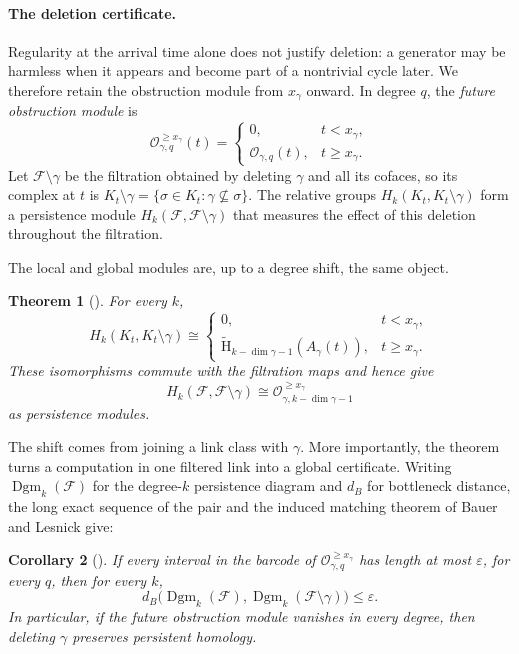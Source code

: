 \documentclass[11pt,letterpaper]{article}
\newtheorem{theorem}{Theorem}[section]
\newtheorem{corollary}[theorem]{Corollary}
\theoremstyle{definition}
\newcommand{\redH}{\widetilde{\mathrm H}}
\newcommand{\Dgm}{\operatorname{Dgm}}
\newcommand{\Oc}{\mathcal O}
\newcommand{\eps}{\varepsilon}
\begin{document}
\paragraph{The deletion certificate.}
Regularity at the arrival time alone does not justify deletion: a generator
may be harmless when it appears and become part of a nontrivial cycle later.
We therefore retain the obstruction module from $x_\gamma$ onward. In degree
$q$, the \emph{future obstruction module} is
$$
\Oc_{\gamma,q}^{\geq x_\gamma}(t)
=
\begin{cases}
0, & t<x_\gamma,\\
\Oc_{\gamma,q}(t), & t\geq x_\gamma.
\end{cases}
$$
Let $\mathcal F\setminus\gamma$ be the filtration obtained by deleting
$\gamma$ and all its cofaces, so its complex at $t$ is
$K_t\setminus\gamma=\{\sigma\in K_t:\gamma\not\subseteq\sigma\}$. The relative
groups $H_k(K_t,K_t\setminus\gamma)$ form a persistence module
$H_k(\mathcal F,\mathcal F\setminus\gamma)$ that measures the effect of this
deletion throughout the filtration.

The local and global modules are, up to a degree shift, the same object.

\begin{theorem}[]
For every $k$,
$$
H_k(K_t,K_t\setminus\gamma)
\cong
\begin{cases}
0, & t<x_\gamma,\\
\redH_{k-\dim\gamma-1}(A_\gamma(t)), & t\geq x_\gamma.
\end{cases}
$$
These isomorphisms commute with the filtration maps and hence give
$$
H_k(\mathcal F,\mathcal F\setminus\gamma)
\cong
\Oc_{\gamma,k-\dim\gamma-1}^{\geq x_\gamma}
$$
as persistence modules.
\end{theorem}

The shift comes from joining a link class with $\gamma$. More importantly, the
theorem turns a computation in one filtered link into a global certificate.
Writing $\Dgm_k(\mathcal F)$ for the degree-$k$ persistence diagram and $d_B$
for bottleneck distance, the long exact sequence of the pair and the induced
matching theorem of Bauer and Lesnick \cite{BauerLesnick2015} give:

\begin{corollary}[]
If every interval in the barcode of
$\Oc_{\gamma,q}^{\geq x_\gamma}$ has length at most $\eps$, for every $q$, then
for every $k$,
$$
d_B\bigl(\Dgm_k(\mathcal F),
          \Dgm_k(\mathcal F\setminus\gamma)\bigr)
\leq\eps.
$$
In particular, if the future obstruction module vanishes in every degree,
then deleting $\gamma$ preserves persistent homology.
\end{corollary}
\end{document}
